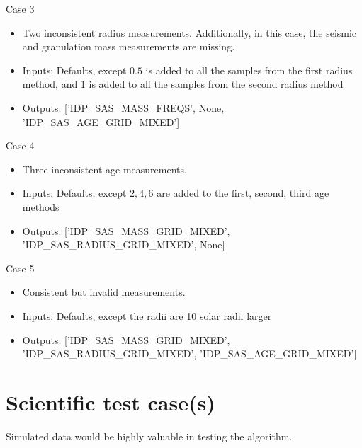 \documentclass[a4paper, oneside, 11pt, article, english]{memoir}
\begin{document}
Case 3
  \begin{itemize}
      \firmlist
      \item Two inconsistent radius measurements. Additionally, in this case, the seismic and granulation mass measurements are missing. 
      \item Inputs: Defaults, except $0.5$ is added to all the samples from the first radius method, and 1 is added to all the samples from the second radius method
      \item Outputs: ['IDP\_SAS\_MASS\_FREQS', None, 'IDP\_SAS\_AGE\_GRID\_MIXED']
  \end{itemize}

Case 4
  \begin{itemize}
      \firmlist
      \item Three inconsistent age measurements. 
      \item Inputs: Defaults, except $2,4,6$ are added to the first, second, third age methods 
      \item Outputs: ['IDP\_SAS\_MASS\_GRID\_MIXED', 'IDP\_SAS\_RADIUS\_GRID\_MIXED', None]
  \end{itemize}

Case 5
\begin{itemize}
    \firmlist
    \item Consistent but invalid measurements. 
     \item Inputs: Defaults, except the radii are 10 solar radii larger 
     \item Outputs: ['IDP\_SAS\_MASS\_GRID\_MIXED', 'IDP\_SAS\_RADIUS\_GRID\_MIXED', 'IDP\_SAS\_AGE\_GRID\_MIXED']
\end{itemize}

\section{Scientific test case(s)}
\label{sec:test-science}

Simulated data would be highly valuable in testing the algorithm. 


%
\end{document}
